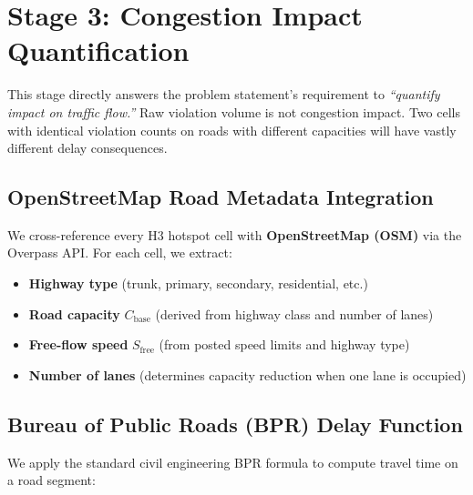 \documentclass[12pt,a4paper]{article}
\begin{document}
\section{Stage 3: Congestion Impact Quantification}

This stage directly answers the problem statement's requirement to \textit{``quantify impact on traffic flow.''} Raw violation volume is not congestion impact. Two cells with identical violation counts on roads with different capacities will have vastly different delay consequences.

\subsection{OpenStreetMap Road Metadata Integration}

We cross-reference every H3 hotspot cell with \textbf{OpenStreetMap (OSM)} via the Overpass API. For each cell, we extract:
\begin{itemize}
    \item \textbf{Highway type} (trunk, primary, secondary, residential, etc.)
    \item \textbf{Road capacity} $C_\text{base}$ (derived from highway class and number of lanes)
    \item \textbf{Free-flow speed} $S_\text{free}$ (from posted speed limits and highway type)
    \item \textbf{Number of lanes} (determines capacity reduction when one lane is occupied)
\end{itemize}

\subsection{Bureau of Public Roads (BPR) Delay Function}

We apply the standard civil engineering BPR formula to compute travel time on a road segment:
\end{document}
